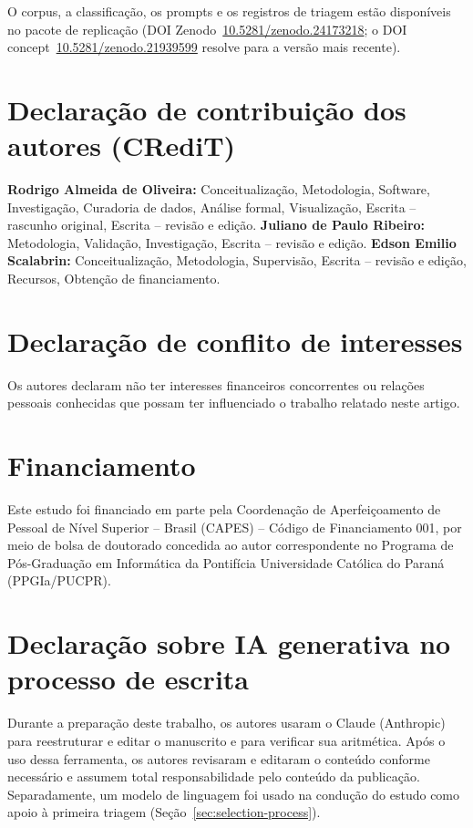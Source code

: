 \documentclass[preprint,12pt,authoryear=false]{elsarticle}
\begin{document}
O corpus, a classificação, os prompts e os registros de triagem estão disponíveis no pacote de replicação (DOI Zenodo~\href{https://doi.org/10.5281/zenodo.24173218}{10.5281/zenodo.24173218}; o DOI concept~\href{https://doi.org/10.5281/zenodo.21939599}{10.5281/zenodo.21939599} resolve para a versão mais recente).

\section*{Declaração de contribuição dos autores (CRediT)}
\textbf{Rodrigo Almeida de Oliveira:} Conceitualização, Metodologia, Software, Investigação, Curadoria de dados, Análise formal, Visualização, Escrita -- rascunho original, Escrita -- revisão e edição.
\textbf{Juliano de Paulo Ribeiro:} Metodologia, Validação, Investigação, Escrita -- revisão e edição.
\textbf{Edson Emilio Scalabrin:} Conceitualização, Metodologia, Supervisão, Escrita -- revisão e edição, Recursos, Obtenção de financiamento.

\section*{Declaração de conflito de interesses}
Os autores declaram não ter interesses financeiros concorrentes ou relações pessoais conhecidas que possam ter influenciado o trabalho relatado neste artigo.

\section*{Financiamento}
Este estudo foi financiado em parte pela Coordenação de Aperfeiçoamento de Pessoal de Nível Superior -- Brasil (CAPES) -- Código de Financiamento 001, por meio de bolsa de doutorado concedida ao autor correspondente no Programa de Pós-Graduação em Informática da Pontifícia Universidade Católica do Paraná (PPGIa/PUCPR).

\section*{Declaração sobre IA generativa no processo de escrita}
Durante a preparação deste trabalho, os autores usaram o Claude (Anthropic) para reestruturar e editar o manuscrito e para verificar sua aritmética. Após o uso dessa ferramenta, os autores revisaram e editaram o conteúdo conforme necessário e assumem total responsabilidade pelo conteúdo da publicação. Separadamente, um modelo de linguagem foi usado na condução do estudo como apoio à primeira triagem (Seção~\ref{sec:selection-process}).
\end{document}
